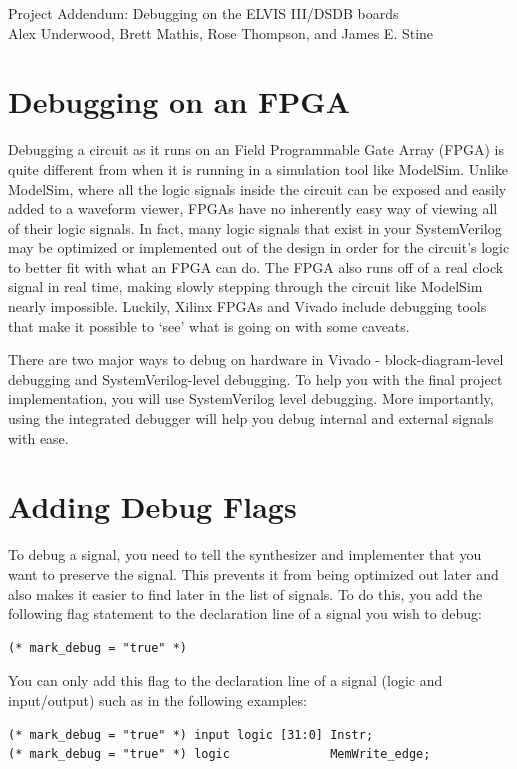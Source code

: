 \documentclass{article}
\newcommand{\myassignment}{Project Addendum: Debugging on the ELVIS III/DSDB boards}
\newcommand{\myinstructor}{Alex Underwood, Brett Mathis, Rose Thompson, and James E. Stine}
\begin{document}
\graphicspath{{.}{./latex_graphics/}}
\begin{center}
  {\huge \myassignment} \\
  \myinstructor \\
\end{center}

\section{Debugging on an FPGA}
Debugging a circuit as it runs on an Field Programmable Gate Array (FPGA)
is quite different from when
it is running in a simulation tool like ModelSim.  Unlike ModelSim,
where all the logic signals inside the circuit can be exposed and
easily added to a waveform viewer, FPGAs have no inherently easy way
of viewing all of their logic signals.  In fact, many logic signals
that exist in your SystemVerilog may be optimized or implemented out of the
design in order for the circuit's logic to better fit with what an
FPGA can do.  The FPGA also runs off of a real clock signal in real
time, making slowly stepping through the circuit like ModelSim nearly
impossible.  Luckily, Xilinx FPGAs and Vivado include debugging tools
that make it possible to `see' what is going on with some caveats.

There are two major ways to debug on hardware in Vivado -
block-diagram-level debugging and SystemVerilog-level debugging.  To
help you with the final project implementation,
you will use SystemVerilog level debugging.  More importantly, using
the integrated debugger will help you debug internal and external
signals with ease.

\section{Adding Debug Flags}
To debug a signal, you need to tell the synthesizer and implementer
that you want to preserve the signal.  This prevents it from being
optimized out later and also makes it easier to find later in the list
of signals.  To do this, you add the following flag statement to the
declaration line of a signal you wish to debug:
\begin{verbatim}
(* mark_debug = "true" *)
\end{verbatim}
You can only add this flag to the declaration line of a signal
(logic and input/output) such as in the following examples:
\begin{verbatim}
(* mark_debug = "true" *) input logic [31:0] Instr;
(* mark_debug = "true" *) logic              MemWrite_edge;
\end{verbatim}
	
\end{document}
